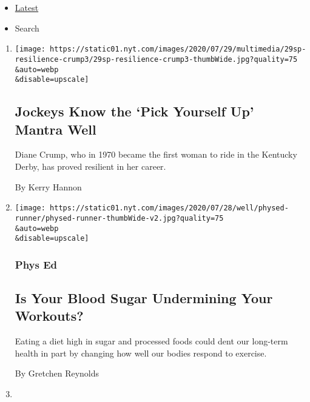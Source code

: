 \begin{itemize}
\tightlist
\item
  \protect\hyperlink{stream-panel}{Latest}
\item
  Search
\end{itemize}

\begin{enumerate}
\def\labelenumi{\arabic{enumi}.}
\item
  \href{/2020/07/29/sports/horse-racing/diane-crump.html}{}

  \texttt{[image: https://static01.nyt.com/images/2020/07/29/multimedia/29sp-resilience-crump3/29sp-resilience-crump3-thumbWide.jpg?quality=75\\\&auto=webp\\\&disable=upscale]}

  \hypertarget{jockeys-know-the-pick-yourself-up-mantra-well}{%
  \subsection{Jockeys Know the `Pick Yourself Up' Mantra
  Well}\label{jockeys-know-the-pick-yourself-up-mantra-well}}

  Diane Crump, who in 1970 became the first woman to ride in the
  Kentucky Derby, has proved resilient in her career.

  By Kerry Hannon
\item
  \href{/2020/07/29/well/move/blood-sugar-diet-foods-workouts-exercise-muscles.html}{}

  \texttt{[image: https://static01.nyt.com/images/2020/07/28/well/physed-runner/physed-runner-thumbWide-v2.jpg?quality=75\\\&auto=webp\\\&disable=upscale]}

  \hypertarget{phys-ed}{%
  \subsubsection{Phys Ed}\label{phys-ed}}

  \hypertarget{is-your-blood-sugar-undermining-your-workouts}{%
  \subsection{Is Your Blood Sugar Undermining Your
  Workouts?}\label{is-your-blood-sugar-undermining-your-workouts}}

  Eating a diet high in sugar and processed foods could dent our
  long-term health in part by changing how well our bodies respond to
  exercise.

  By Gretchen Reynolds
\item
  \href{/2020/07/28/movies/love-basketball-viewing-party.html}{}


\end{enumerate}
